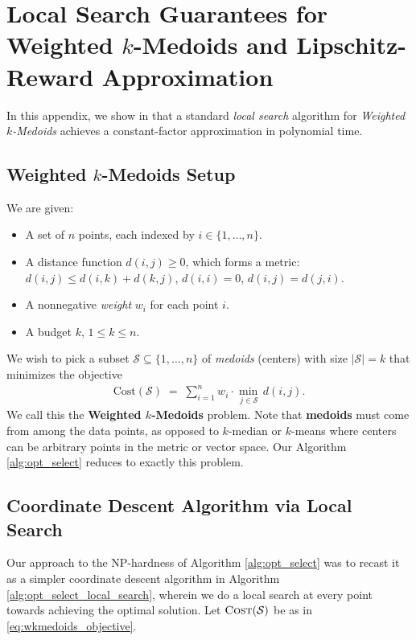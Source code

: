\section{Local Search Guarantees for Weighted \texorpdfstring{$k$}{k}-Medoids and Lipschitz-Reward Approximation}
\label{sec:local_search_kmedoids}

In this appendix, we show in  that a standard \emph{local search} algorithm for \emph{Weighted $k$-Medoids} achieves a constant-factor approximation in polynomial time.


\subsection{Weighted \texorpdfstring{$k$}{k}-Medoids Setup}

We are given:
\begin{itemize}
\item A set of $n$ points, each indexed by $i\in\{1,\dots,n\}$.
\item A distance function $d(i,j)\ge0$, which forms a metric: $d(i,j)\le d(i,k)+d(k,j)$, $d(i,i)=0$, $d(i,j)=d(j,i)$.
\item A nonnegative \emph{weight} $w_i$ for each point $i$.
\item A budget $k$, $1\le k\le n$.
\end{itemize}
We wish to pick a subset $\mathcal{S}\subseteq\{1,\dots,n\}$ of \emph{medoids} (centers) with size $|\mathcal{S}|=k$ that minimizes the objective
\begin{align}
\label{eq:wkmedoids_objective}
\mathrm{Cost}(\mathcal{S})
\;=\;
\sum_{i=1}^n
  w_i
  \cdot
  \min_{\,j\in \mathcal{S}}\,
    d(i,j).
\end{align}
We call this the \textbf{Weighted $k$-Medoids} problem.  Note that \textbf{medoids} must come from among the data points, as opposed to $k$-median or $k$-means where centers can be arbitrary points in the metric or vector space. Our Algorithm \ref{alg:opt_select} reduces to exactly this problem.

\subsection{Coordinate Descent Algorithm via Local Search}

Our approach to the NP-hardness of Algorithm \ref{alg:opt_select} was to recast it as a simpler coordinate descent algorithm in Algorithm \ref{alg:opt_select_local_search}, wherein we do a local search at every point towards achieving the optimal solution.
Let $\textsc{Cost}(\mathcal{S})$ be as in \eqref{eq:wkmedoids_objective}.

